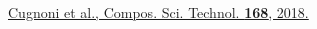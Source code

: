 \documentclass[first,firstsupp,lastsupp,last,hyperref,table]{ETHclass}
\begin{document}
\begin{frame}
\begin{columns}[c]
\begin{column}{0.5\textwidth}
\centering
\end{column}
\end{columns}
\vspace{0.15cm}
\begin{columns}[b]
\begin{column}{0.5\textwidth}
\centering
\pgfmathsetmacro{}
\pgfmathsetmacro{}
{\fontsize{\fontsizeref}{\stretchref} \selectfont \href{https://doi.org/10.1016/j.compscitech.2018.08.037}{Cugnoni et al., Compos. Sci. Technol. \textbf{168}, 2018.}}
\end{column}
\begin{column}{0.5\textwidth}
\centering
\end{column}
\end{columns}
\end{frame}

\addtocounter{framenumber}{-1}
\end{document}
